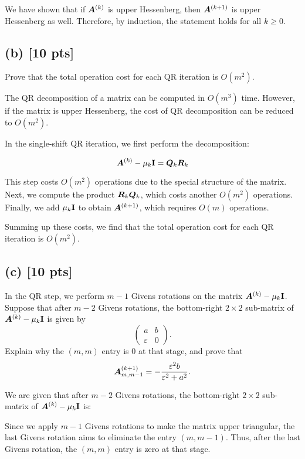 \documentclass[twoside,10pt]{article}
\begin{document}
We have shown that if $\bm{A}^{(k)}$ is upper Hessenberg, then $\bm{A}^{(k+1)}$ is upper Hessenberg as well. Therefore, by induction, the statement holds for all $k \geq 0$.

  \subsection*{(b) [10 pts]}
  Prove that the total operation cost for each QR iteration is $O(m^2)$.

  The QR decomposition of a matrix can be computed in $O(m^3)$ time. However, if the matrix is upper Hessenberg, the cost of QR decomposition can be reduced to $O(m^2)$. 

In the single-shift QR iteration, we first perform the decomposition:

$$\bm{A}^{(k)} - \mu_k \mathbf{I} = \bm{Q}_k \bm{R}_k$$

This step costs $O(m^2)$ operations due to the special structure of the matrix. Next, we compute the product $\bm{R}_k \bm{Q}_k$, which costs another $O(m^2)$ operations. Finally, we add $\mu_k \mathbf{I}$ to obtain $\bm{A}^{(k+1)}$, which requires $O(m)$ operations. 

Summing up these costs, we find that the total operation cost for each QR iteration is $O(m^2)$.

  \subsection*{(c) [10 pts]}
  In the QR step, we perform $m - 1$ Givens rotations on the matrix $\bm{A}^{(k)} - \mu_k \mathbf{I}$. 
  Suppose that after $m - 2$ Givens rotations, the bottom-right $2 \times 2$ sub-matrix of $\bm{A}^{(k)} - \mu_k \mathbf{I}$ is given by
  \begin{equation}
    \begin{pmatrix}
      a & b \\
      \varepsilon & 0
    \end{pmatrix}.
  \end{equation}
  Explain why the $(m, m)$ entry is $0$ at that stage, and prove that 
  \begin{equation}
    \bm{A}_{m, m-1}^{(k + 1)} = - \frac{\varepsilon^2 b}{\varepsilon^2 + a^2}.
  \end{equation}

  We are given that after $m - 2$ Givens rotations, the bottom-right $2 \times 2$ sub-matrix of $\bm{A}^{(k)} - \mu_k \mathbf{I}$ is:

  Since we apply $m-1$ Givens rotations to make the matrix upper triangular, the last Givens rotation aims to eliminate the entry $(m, m-1)$. Thus, after the last Givens rotation, the $(m, m)$ entry is zero at that stage.
\end{document}
